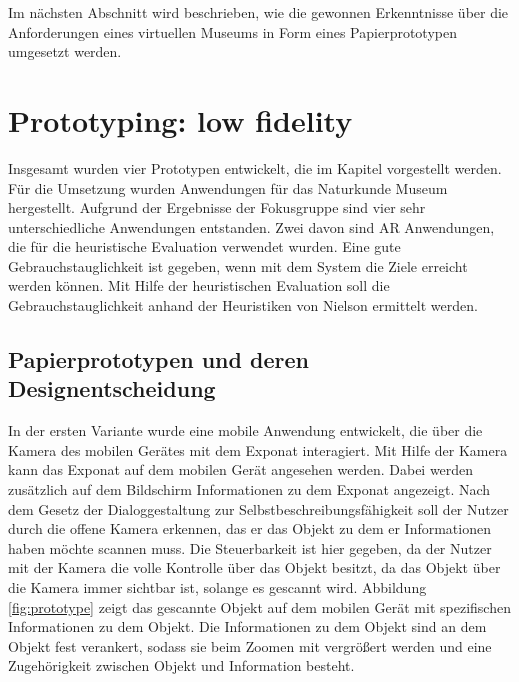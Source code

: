 \documentclass[runningheads,a4paper]{llncs}
\begin{document}





Im nächsten Abschnitt wird beschrieben, wie die gewonnen Erkenntnisse über die Anforderungen eines virtuellen Museums in Form eines Papierprototypen umgesetzt werden.

\section{Prototyping: low fidelity}
Insgesamt wurden vier Prototypen entwickelt, die im Kapitel  vorgestellt werden. Für die Umsetzung wurden Anwendungen für das Naturkunde Museum hergestellt. Aufgrund der Ergebnisse der Fokusgruppe sind vier sehr unterschiedliche Anwendungen entstanden. Zwei davon sind AR Anwendungen, die für die heuristische Evaluation verwendet wurden. Eine gute Gebrauchstauglichkeit ist gegeben, wenn mit dem System die Ziele erreicht werden können. Mit Hilfe der heuristischen Evaluation soll die Gebrauchstauglichkeit anhand der Heuristiken von Nielson ermittelt werden.\\

 
\subsection{Papierprototypen und deren Designentscheidung} \label{chapt:paperproto}
In der ersten Variante wurde eine mobile Anwendung entwickelt, die über die Kamera des mobilen Gerätes mit dem Exponat interagiert. Mit Hilfe der Kamera kann das Exponat auf dem mobilen Gerät angesehen werden. Dabei werden zusätzlich auf dem Bildschirm  Informationen zu dem Exponat angezeigt. Nach dem Gesetz der Dialoggestaltung zur Selbstbeschreibungsfähigkeit soll der Nutzer durch die offene Kamera erkennen, das er das Objekt zu dem er Informationen haben möchte scannen muss. Die Steuerbarkeit ist hier gegeben, da der Nutzer mit der Kamera die volle Kontrolle über das Objekt besitzt, da das Objekt über die Kamera immer sichtbar ist, solange es gescannt wird. Abbildung \ref{fig:prototype} zeigt das gescannte Objekt auf dem mobilen Gerät mit spezifischen Informationen zu dem Objekt. Die Informationen zu dem Objekt sind an dem Objekt fest verankert, sodass sie beim Zoomen mit vergrößert werden und eine Zugehörigkeit zwischen Objekt und Information besteht.\\
\end{document}

